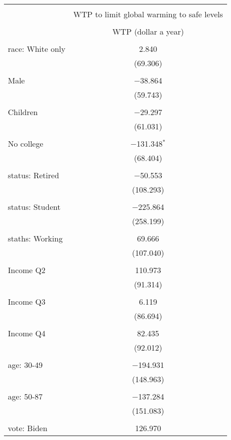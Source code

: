 
\begin{tabular}{@{\extracolsep{5pt}}lc} 
\\[-1.8ex]\hline 
\hline \\[-1.8ex] 
 & \multicolumn{1}{c}{WTP to limit global warming to safe levels} \\ 
\cline{2-2} 
\\[-1.8ex] & WTP (dollar a year) \\ 
\hline \\[-1.8ex] 
 race: White only & 2.840 \\ 
  & (69.306) \\ 
  & \\ 
 Male & $-$38.864 \\ 
  & (59.743) \\ 
  & \\ 
 Children & $-$29.297 \\ 
  & (61.031) \\ 
  & \\ 
 No college & $-$131.348$^{*}$ \\ 
  & (68.404) \\ 
  & \\ 
 status: Retired & $-$50.553 \\ 
  & (108.293) \\ 
  & \\ 
 status: Student & $-$225.864 \\ 
  & (258.199) \\ 
  & \\ 
 staths: Working & 69.666 \\ 
  & (107.040) \\ 
  & \\ 
 Income Q2 & 110.973 \\ 
  & (91.314) \\ 
  & \\ 
 Income Q3 & 6.119 \\ 
  & (86.694) \\ 
  & \\ 
 Income Q4 & 82.435 \\ 
  & (92.012) \\ 
  & \\ 
 age: 30-49 & $-$194.931 \\ 
  & (148.963) \\ 
  & \\ 
 age: 50-87 & $-$137.284 \\ 
  & (151.083) \\ 
  & \\ 
 vote: Biden & 126.970 \\ 

\end{tabular}
